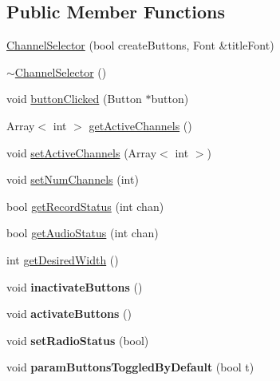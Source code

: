 \subsection*{Public Member Functions}
\begin{DoxyCompactItemize}
\item 
\hyperlink{classChannelSelector_a593fc6e836661a86e0ca788bffdb4d24}{Channel\-Selector} (bool create\-Buttons, Font \&title\-Font)
\item 
\hyperlink{classChannelSelector_a918cd253d71e3a26e6b6bb8b1be52eed}{$\sim$\-Channel\-Selector} ()
\item 
void \hyperlink{classChannelSelector_afe0c3299f08f26d6872a7bfe6b20069e}{button\-Clicked} (Button $\ast$button)
\item 
Array$<$ int $>$ \hyperlink{classChannelSelector_ad2397a6d709a0ef783527e4c5f2fbf9f}{get\-Active\-Channels} ()
\item 
void \hyperlink{classChannelSelector_a30faca8ee72022f68e2ea776453f801a}{set\-Active\-Channels} (Array$<$ int $>$)
\item 
void \hyperlink{classChannelSelector_a717956a6b754e1aa157371851c396c79}{set\-Num\-Channels} (int)
\item 
bool \hyperlink{classChannelSelector_a1de299562edcbc0d4249a7fc5d22917f}{get\-Record\-Status} (int chan)
\item 
bool \hyperlink{classChannelSelector_a846b95d112e09cec70d426a80731eda5}{get\-Audio\-Status} (int chan)
\item 
int \hyperlink{classChannelSelector_a7865695da614c8ee1e3106c545dd12f4}{get\-Desired\-Width} ()
\item 
\hypertarget{classChannelSelector_a53d43af4d197bd3def9c96b0c98811e2}{void {\bfseries inactivate\-Buttons} ()}\label{classChannelSelector_a53d43af4d197bd3def9c96b0c98811e2}

\item 
\hypertarget{classChannelSelector_adcc831c5ba479d04df8ee711f169311d}{void {\bfseries activate\-Buttons} ()}\label{classChannelSelector_adcc831c5ba479d04df8ee711f169311d}

\item 
\hypertarget{classChannelSelector_ae4fc9b23915004fb4f1ade854e7dddb4}{void {\bfseries set\-Radio\-Status} (bool)}\label{classChannelSelector_ae4fc9b23915004fb4f1ade854e7dddb4}

\item 
\hypertarget{classChannelSelector_a10b3542c4c5f2815b663692649b69eea}{void {\bfseries param\-Buttons\-Toggled\-By\-Default} (bool t)}\label{classChannelSelector_a10b3542c4c5f2815b663692649b69eea}

\end{DoxyCompactItemize}
